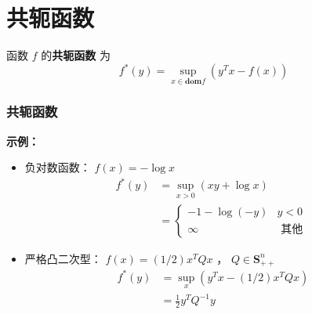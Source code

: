 \documentclass[handout,10pt]{beamer}
\begin{document}
\section{共轭函数}
\begin{frame}
\mytitle{\secno \secname}

\bigskip

\begin{mydefinition}
	 函数 $f$ 的\textbf{共轭函数} 为
	\begin{equation}
		f^{*}(y)=\sup _{x \in \textbf{dom} f}\left(y^{T} x-f(x)\right)
	\end{equation}
\end{mydefinition}



\end{frame}
\begin{frame}
	\frametitle{共轭函数}
	\textbf{示例：}
	
	\begin{itemize}[<+->]
		\item 负对数函数： $f(x)=-\log x$
		\begin{equation}
			\begin{aligned}
            f^{*}(y) &=\sup _{x>0}(x y+\log x) \\
            &=\left\{\begin{array}{ll}
            -1-\log (-y) & y<0 \\
            \infty & \text { 其他 }
            \end{array}\right.
            \end{aligned}
		\end{equation}
		
		\item 严格凸二次型： $f(x)=(1 / 2) x^{T} Q x$ ， $Q \in \mathbf{S}_{++}^{n}$
		\begin{equation}
			\begin{aligned}
            f^{*}(y) &=\sup _{x}\left(y^{T} x-(1 / 2) x^{T} Q x\right) \\
            &=\frac{1}{2} y^{T} Q^{-1} y
            \end{aligned}
		\end{equation}
	\end{itemize}

\end{frame}
\end{document}
